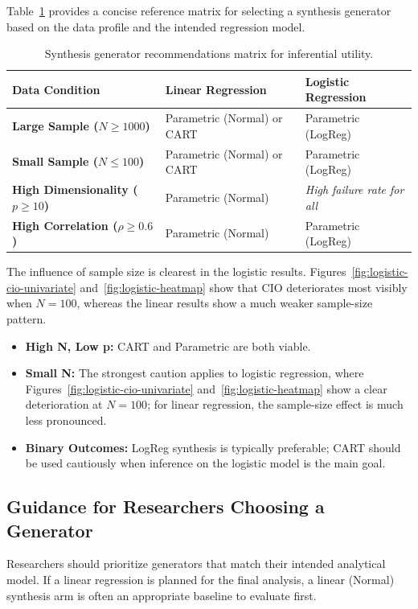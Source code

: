 Table~\ref{tab:generator_recommendations} provides a concise reference matrix for selecting a synthesis generator based on the data profile and the intended regression model.

\begin{table}[H]
  \centering
  \caption[Generator Recommendations by Scenario]{Synthesis generator recommendations matrix for inferential utility.}
  \label{tab:generator_recommendations}
  \renewcommand{\arraystretch}{1.3}
  \begin{tabular}{@{}lll@{}}
    \toprule
    \textbf{Data Condition} & \textbf{Linear Regression} & \textbf{Logistic Regression} \\ \midrule
    \textbf{Large Sample ($N \ge 1000$)} & Parametric (Normal) or CART & Parametric (LogReg) \\
    \textbf{Small Sample ($N \le 100$)} & Parametric (Normal) or CART & Parametric (LogReg) \\
    \textbf{High Dimensionality ($p \ge 10$)} & Parametric (Normal) & \textit{High failure rate for all} \\
    \textbf{High Correlation ($\rho \ge 0.6$)} & Parametric (Normal) & Parametric (LogReg) \\ \bottomrule
  \end{tabular}
\end{table}

The influence of sample size is clearest in the logistic results. Figures~\ref{fig:logistic-cio-univariate} and~\ref{fig:logistic-heatmap} show that CIO deteriorates most visibly when $N=100$, whereas the linear results show a much weaker sample-size pattern.

\begin{itemize}
    \item \textbf{High N, Low p:} CART and Parametric are both viable.
    \item \textbf{Small N:} The strongest caution applies to logistic regression, where Figures~\ref{fig:logistic-cio-univariate} and~\ref{fig:logistic-heatmap} show a clear deterioration at $N=100$; for linear regression, the sample-size effect is much less pronounced.
    \item \textbf{Binary Outcomes:} LogReg synthesis is typically preferable; CART should be used cautiously when inference on the logistic model is the main goal.
\end{itemize}

\subsection{Guidance for Researchers Choosing a Generator}
Researchers should prioritize generators that match their intended analytical model. If a linear regression is planned for the final analysis, a linear (Normal) synthesis arm is often an appropriate baseline to evaluate first.

